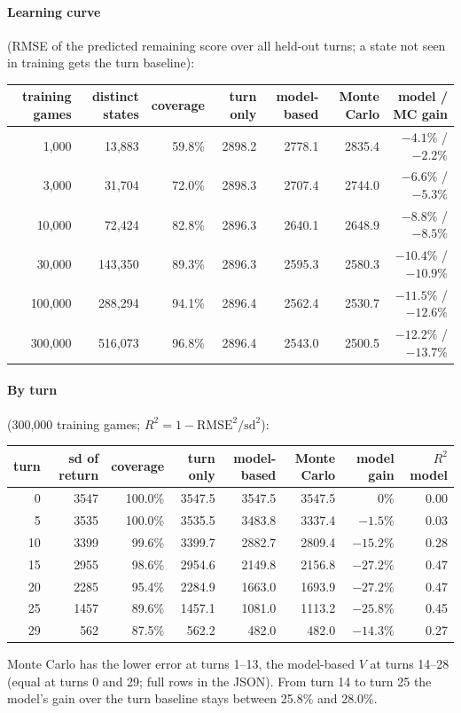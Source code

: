 \documentclass{../polyexp}
\begin{document}
\paragraph{Learning curve} (RMSE of the predicted remaining score over all held-out turns; a state not seen in
training gets the turn baseline):

\begin{center}\small
\begin{tabular}{rrrrrrr}
\toprule
training games & distinct states & coverage & turn only & model-based & Monte Carlo & model / MC gain \\
\midrule
1{,}000   & 13{,}883  & 59.8\% & 2898.2 & 2778.1 & 2835.4 & $-4.1\%$ / $-2.2\%$ \\
3{,}000   & 31{,}704  & 72.0\% & 2898.3 & 2707.4 & 2744.0 & $-6.6\%$ / $-5.3\%$ \\
10{,}000  & 72{,}424  & 82.8\% & 2896.3 & 2640.1 & 2648.9 & $-8.8\%$ / $-8.5\%$ \\
30{,}000  & 143{,}350 & 89.3\% & 2896.3 & 2595.3 & 2580.3 & $-10.4\%$ / $-10.9\%$ \\
100{,}000 & 288{,}294 & 94.1\% & 2896.4 & 2562.4 & 2530.7 & $-11.5\%$ / $-12.6\%$ \\
300{,}000 & 516{,}073 & 96.8\% & 2896.4 & 2543.0 & 2500.5 & $-12.2\%$ / $-13.7\%$ \\
\bottomrule
\end{tabular}
\end{center}

\paragraph{By turn} (300{,}000 training games; $R^2 = 1 - \text{RMSE}^2/\text{sd}^2$):

\begin{center}\small
\begin{tabular}{rrrrrrrr}
\toprule
turn & sd of return & coverage & turn only & model-based & Monte Carlo & model gain & $R^2$ model \\
\midrule
0  & 3547 & 100.0\% & 3547.5 & 3547.5 & 3547.5 & 0\%        & 0.00 \\
5  & 3535 & 100.0\% & 3535.5 & 3483.8 & 3337.4 & $-1.5\%$  & 0.03 \\
10 & 3399 & 99.6\%  & 3399.7 & 2882.7 & 2809.4 & $-15.2\%$ & 0.28 \\
15 & 2955 & 98.6\%  & 2954.6 & 2149.8 & 2156.8 & $-27.2\%$ & 0.47 \\
20 & 2285 & 95.4\%  & 2284.9 & 1663.0 & 1693.9 & $-27.2\%$ & 0.47 \\
25 & 1457 & 89.6\%  & 1457.1 & 1081.0 & 1113.2 & $-25.8\%$ & 0.45 \\
29 & 562  & 87.5\%  & 562.2  & 482.0  & 482.0  & $-14.3\%$ & 0.27 \\
\bottomrule
\end{tabular}
\end{center}
Monte Carlo has the lower error at turns 1--13, the model-based $V$ at turns 14--28 (equal at turns 0 and 29; full
rows in the JSON). From turn 14 to turn 25 the model's gain over the turn baseline stays between 25.8\% and 28.0\%.
\end{document}
